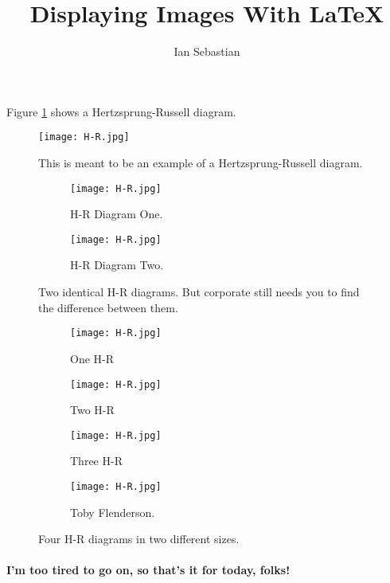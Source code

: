 \documentclass{article}
\title{Displaying Images With \LaTeX}
\author{Ian Sebastian}
\begin{document}
	\maketitle
	
	Figure \ref{fig:H-R} shows a Hertzsprung-Russell diagram.
	
	\begin{figure}[h!]
		\centering
		\texttt{[image: H-R.jpg]}
		\caption{This is meant to be an example of a Hertzsprung-Russell diagram.}
		\label{fig:H-R}
	\end{figure}

	\newpage
	\begin{figure}[h!]
		\centering
		\begin{subfigure}[b]{0.4\linewidth}
			\texttt{[image: H-R.jpg]}
			\caption{H-R Diagram One.}
		\end{subfigure}
		\begin{subfigure}[b]{0.4\linewidth}
			\texttt{[image: H-R.jpg]}
			\caption{H-R Diagram Two.}
		\end{subfigure}
		\caption{Two identical H-R diagrams. But corporate still needs you to find the difference between them.}
		\label{fig:H-R_2}
	\end{figure}

	\newpage
	\begin{figure}
		\centering
		\begin{subfigure}[h]{0.2\linewidth}
			\texttt{[image: H-R.jpg]}
			\caption{One H-R}
		\end{subfigure}
		\begin{subfigure}[h]{0.2\linewidth}
			\texttt{[image: H-R.jpg]}
			\caption{Two H-R}
		\end{subfigure}
		\begin{subfigure}[h]{0.2\linewidth}
			\texttt{[image: H-R.jpg]}
			\caption{Three H-R}
		\end{subfigure}
		\begin{subfigure}[h]{0.5\linewidth}
			\texttt{[image: H-R.jpg]}
			\caption{Toby Flenderson.}
		\end{subfigure}
		\caption{Four H-R diagrams in two different sizes.}
		\label{fig:H-R_4}
	\end{figure}

	\paragraph{I'm too tired to go on, so that's it for today, folks!}
\end{document}
